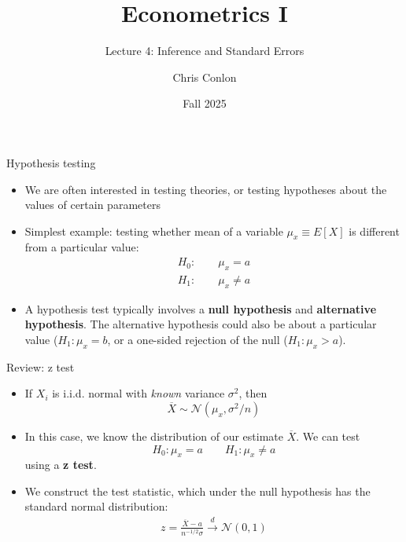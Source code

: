 




\title[L4 - Inference and Standard Errors]{ Econometrics I}
\subtitle{Lecture 4: Inference and Standard Errors}
\author{Chris Conlon}
\date{Fall 2025}
\maketitle



\begin{frame}{Hypothesis testing}
\begin{itemize}
	\item We are often interested in testing theories, or testing hypotheses about
	the values of certain parameters

	\medskip
	\item Simplest example: testing whether mean of a variable $\mu_x \equiv E\left[X\right]$ 
	is different from a particular value:\[
\begin{array}{c}
H_{0}:\qquad\mu_{x}=a\\
H_{1}:\qquad\mu_{x}\ne a
\end{array}
\]

	\medskip
	\item A hypothesis test typically involves a {\bf null hypothesis} and {\bf alternative hypothesis}. 
	The alternative hypothesis could also be about a particular value ($H_{1}:\mu_{x}= b$, or 
	a one-sided rejection of the null ($H_{1}:\mu_{x}>a$).


\end{itemize}
\end{frame}



\begin{frame}{Review: z test}
\begin{itemize}
	\item If $X_i$ is i.i.d. normal with \emph{known} variance $\sigma^2$, then \[
		\overline{X} \sim \mathcal{N} \left( \mu_x, \sigma^{2}/n \right)
	\]


	\item In this case, we know the distribution of our estimate $\overline{X}$. We can test\[
H_{0}:\mu_{x}=a \qquad H_{1}:\mu_{x}\ne a
\]
using a {\bf z test}.

	\item We construct the test statistic, which under the null hypothesis has the standard normal distribution:
	\begin{align*}		z = \frac{ \overline{X} - a}{n^{-1/2}\sigma}
	 \overset{d}{\to} \mathcal{N} \left( 0,1\right)
	 \end{align*}
\end{itemize}
\end{frame}



